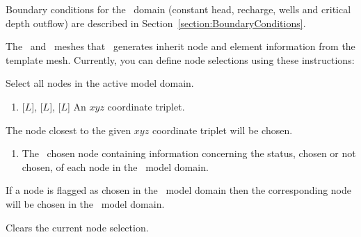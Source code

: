 Boundary conditions for the \swf\ domain (constant head, recharge, wells and critical depth outflow) are described in Section~\ref{section:BoundaryConditions}.

The \swf\ and \gwf\ meshes that \mut\ generates inherit node and element information from the template mesh.  Currently, you can define node selections using these instructions: \label{page:nodeSelect}

    {Select all nodes in the active model domain.
     }

    {
        \squish
        \begin{enumerate}
        \item {} [$L$],  [$L$],  [$L$]  An $xyz$ coordinate triplet.
        \end{enumerate}
        The node closest to the given $xyz$ coordinate triplet will be chosen.
    }

    {
        \squish
        \begin{enumerate}
        \item {}  The \gb\ chosen node  containing information concerning the status, chosen or not chosen, of each node in the \gb\ model domain.
        \end{enumerate}
          If a node is flagged as chosen in the \gb\ model domain then the corresponding node will be chosen in the \mfus\ model domain.
    }

    {Clears the current node selection.
     }


